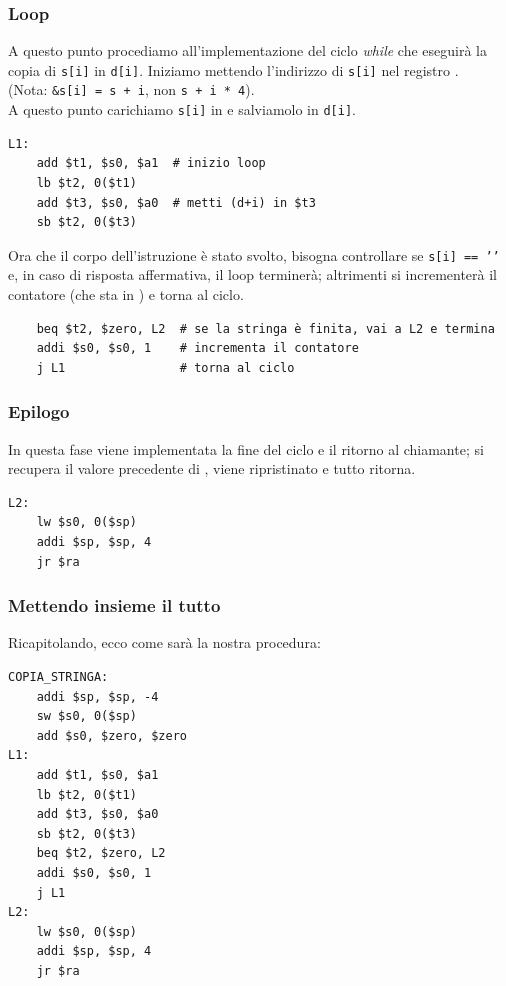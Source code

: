 \documentclass[class=book, crop=false, oneside]{standalone}
\begin{document}
\subsubsection{Loop}
A questo punto procediamo all'implementazione del ciclo \emph{while} che eseguirà la copia di \texttt{s[i]} in \texttt{d[i]}. Iniziamo mettendo l'indirizzo di \texttt{s[i]} nel registro .\\
(Nota: \texttt{&s[i] = s + i}, non \texttt{s + i * 4}).\\
A questo punto carichiamo \texttt{s[i]}
in  e salviamolo in \texttt{d[i]}.
\begin{verbatim}
L1:
	add $t1, $s0, $a1  # inizio loop
	lb $t2, 0($t1)
	add $t3, $s0, $a0  # metti (d+i) in $t3
	sb $t2, 0($t3)
\end{verbatim}
Ora che il corpo dell'istruzione è stato svolto, bisogna controllare se \texttt{s[i] == '\0'} e, in caso di risposta affermativa, il loop terminerà; altrimenti si incrementerà il contatore (che sta in ) e torna al ciclo.
\begin{verbatim}
	beq $t2, $zero, L2  # se la stringa è finita, vai a L2 e termina
	addi $s0, $s0, 1    # incrementa il contatore
	j L1                # torna al ciclo
\end{verbatim}

\subsubsection{Epilogo}
In questa fase viene implementata la fine del ciclo e il ritorno al chiamante; si recupera il valore precedente di , viene ripristinato  e tutto ritorna.
\begin{verbatim}
L2:
	lw $s0, 0($sp)
	addi $sp, $sp, 4
	jr $ra
\end{verbatim}

\subsubsection{Mettendo insieme il tutto}
Ricapitolando, ecco come sarà la nostra procedura:
\begin{verbatim}
COPIA_STRINGA:
	addi $sp, $sp, -4
	sw $s0, 0($sp)
	add $s0, $zero, $zero
L1:
	add $t1, $s0, $a1
	lb $t2, 0($t1)
	add $t3, $s0, $a0
	sb $t2, 0($t3)
	beq $t2, $zero, L2
	addi $s0, $s0, 1
	j L1
L2:
	lw $s0, 0($sp)
	addi $sp, $sp, 4
	jr $ra
\end{verbatim}
\end{document}
